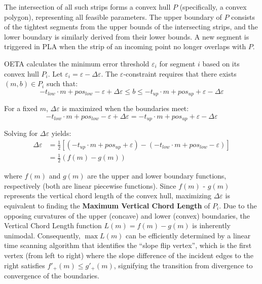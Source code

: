 The intersection of all such strips forms a convex hull $P$ (specifically, a convex polygon), representing all feasible parameters. The upper boundary of $P$ consists of the tightest segments from the upper bounds of the intersecting strips, and the lower boundary is similarly derived from their lower bounds. A new segment is triggered in PLA when the strip of an incoming point no longer overlaps with $P$.

OETA calculates the minimum error threshold $\varepsilon_i$ for segment $i$ based on its convex hull $P_i$. Let $\varepsilon_i = \varepsilon - \Delta\varepsilon$. The $\varepsilon$-constraint requires that there exists $(m, b) \in P_i$ such that:
$$-t_{low} \cdot m + pos_{low} - \varepsilon + \Delta\varepsilon \le b \le -t_{up} \cdot m + pos_{up} + \varepsilon - \Delta\varepsilon$$

For a fixed $m$, $\Delta\varepsilon$ is maximized when the boundaries meet:
$$-t_{low} \cdot m + pos_{low} - \varepsilon + \Delta\varepsilon = -t_{up} \cdot m + pos_{up} + \varepsilon - \Delta\varepsilon$$

Solving for $\Delta\varepsilon$ yields:
$$
\begin{aligned}
\Delta\varepsilon &= \frac{1}{2} \left[ (-t_{up} \cdot m + pos_{up} + \varepsilon) - (-t_{low} \cdot m + pos_{low} - \varepsilon) \right] \\
&= \frac{1}{2} (f(m) - g(m))
\end{aligned}
$$

where $f(m)$ and $g(m)$ are the upper and lower boundary functions, respectively (both are linear piecewise functions). Since $f(m)$ - $g(m)$ represents the vertical chord length of the convex hull, maximizing $\Delta\varepsilon$ is equivalent to finding the \textbf{Maximum Vertical Chord Length} of $P_i$. Due to the opposing curvatures of the upper (concave) and lower (convex) boundaries, the Vertical Chord Length function $L(m) = f(m) - g(m)$ is inherently unimodal. Consequently, $\max L(m)$ can be efficiently determined by a linear time scanning algorithm that identifies the ``slope flip vertex'', which is the first vertex (from left to right) where the slope difference of the incident edges to the right satisfies $f'_+(m) \le g'_+(m)$, signifying the transition from divergence to convergence of the boundaries.

